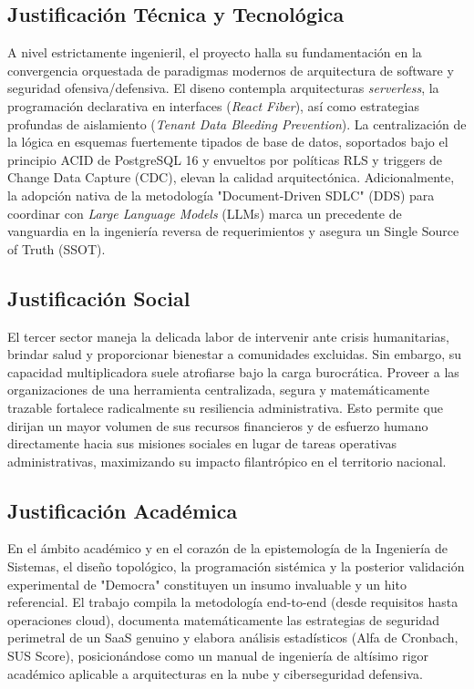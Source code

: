 \documentclass[11pt,a4paper,oneside]{report}
\begin{document}
\subsection{Justificaci\'on T\'ecnica y Tecnol\'ogica}
A nivel estrictamente ingenieril, el proyecto halla su fundamentaci\'on en la convergencia orquestada de paradigmas modernos de arquitectura de software y seguridad ofensiva/defensiva. El diseno contempla arquitecturas \textit{serverless}, la programaci\'on declarativa en interfaces (\textit{React Fiber}), as\'i como estrategias profundas de aislamiento (\textit{Tenant Data Bleeding Prevention}). La centralizaci\'on de la l\'ogica en esquemas fuertemente tipados de base de datos, soportados bajo el principio ACID de PostgreSQL 16 y envueltos por pol\'iticas RLS y triggers de Change Data Capture (CDC), elevan la calidad arquitect\'onica. Adicionalmente, la adopci\'on nativa de la metodolog\'ia "Document-Driven SDLC" (DDS) para coordinar con \textit{Large Language Models} (LLMs) marca un precedente de vanguardia en la ingenier\'ia reversa de requerimientos y asegura un Single Source of Truth (SSOT).

\subsection{Justificaci\'on Social}
El tercer sector maneja la delicada labor de intervenir ante crisis humanitarias, brindar salud y proporcionar bienestar a comunidades excluidas. Sin embargo, su capacidad multiplicadora suele atrofiarse bajo la carga burocr\'atica. Proveer a las organizaciones de una herramienta centralizada, segura y matemáticamente trazable fortalece radicalmente su resiliencia administrativa. Esto permite que dirijan un mayor volumen de sus recursos financieros y de esfuerzo humano directamente hacia sus misiones sociales en lugar de tareas operativas administrativas, maximizando su impacto filantr\'opico en el territorio nacional.

\subsection{Justificaci\'on Acad\'emica}
En el \'ambito acad\'emico y en el coraz\'on de la epistemolog\'ia de la Ingenier\'ia de Sistemas, el dise\~no topol\'ogico, la programaci\'on sist\'emica y la posterior validaci\'on experimental de "Democra" constituyen un insumo invaluable y un hito referencial. El trabajo compila la metodolog\'ia end-to-end (desde requisitos hasta operaciones cloud), documenta matem\'aticamente las estrategias de seguridad perimetral de un SaaS genuino y elabora an\'alisis estad\'isticos (Alfa de Cronbach, SUS Score), posicion\'andose como un manual de ingenier\'ia de alt\'isimo rigor acad\'emico aplicable a arquitecturas en la nube y ciberseguridad defensiva.
\end{document}

